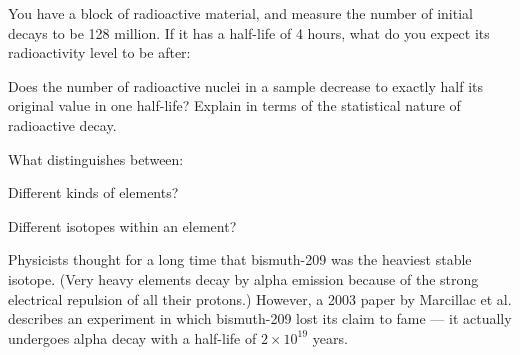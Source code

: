 \documentclass[12pt]{exam}
\begin{document}
\begin{questions}
		
	\question You have a block of radioactive material, and measure the number of initial decays to be 128 million. If it has a half-life of 4 hours, what do you expect its radioactivity level to be after:
		
	\question Does the number of radioactive nuclei in a sample decrease to exactly half its original value in one half-life? Explain in terms of the statistical
nature of radioactive decay.
	\vspace{0.5in}
		
	\question What distinguishes between:
		\begin{parts}
			\item Different kinds of elements?
				\vspace{0.3in}
			\item Different isotopes within an element?
				\vspace{0.3in}
		\end{parts}
		
	\question Physicists thought for a long time that bismuth-209 was the
heaviest stable isotope. (Very heavy elements decay by alpha emission because of the strong electrical repulsion of all their protons.)
However, a 2003 paper by Marcillac et al. describes an experiment
in which bismuth-209 lost its claim to fame — it actually undergoes
alpha decay with a half-life of $2\times 10^{19}$ years.
	\begin{parts}

\end{parts}
\end{questions}
\end{document}
